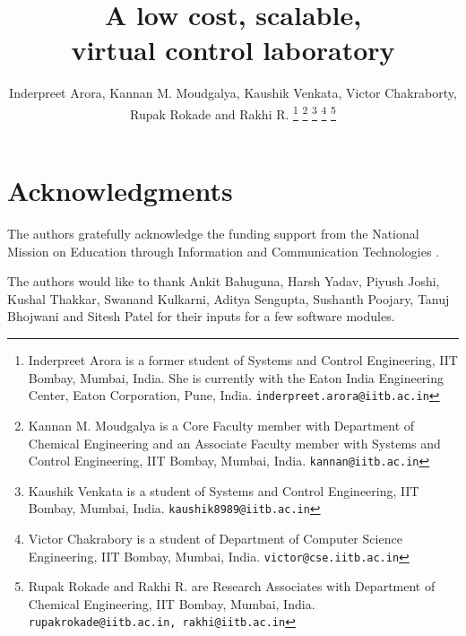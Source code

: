 \documentclass[a4paper, 10pt, conference]{ieeeconf}
\title{\LARGE \bf
A low cost, scalable, \\ virtual control laboratory
}
\author{Inderpreet Arora, Kannan M. Moudgalya, Kaushik Venkata, Victor
  Chakraborty, Rupak Rokade and Rakhi R.%
\thanks{Inderpreet Arora is a former student of Systems and Control
  Engineering, IIT Bombay, Mumbai, India. She is currently with the
  Eaton India Engineering Center, Eaton Corporation, Pune, India. 
        {\tt\small inderpreet.arora@iitb.ac.in}}
\thanks{Kannan M. Moudgalya is a Core Faculty member with Department
  of Chemical Engineering and an Associate Faculty member with Systems
  and Control Engineering, IIT Bombay, Mumbai, India. 
        {\tt\small kannan@iitb.ac.in}}%
\thanks{Kaushik Venkata is a student of Systems and Control
  Engineering, IIT Bombay, Mumbai, India. 
        {\tt\small kaushik8989@iitb.ac.in}}
\thanks{Victor Chakrabory is a student of Department of Computer
  Science Engineering, IIT Bombay, Mumbai, India. 
        {\tt\small victor@cse.iitb.ac.in}}
\thanks{Rupak Rokade and Rakhi R. are Research Associates with
  Department of Chemical Engineering, IIT Bombay, Mumbai, India. 
        {\tt\small rupakrokade@iitb.ac.in, rakhi@iitb.ac.in}}%
}
\begin{document}
\maketitle
\thispagestyle{empty}
\pagestyle{empty}










%






\section*{Acknowledgments}
The authors gratefully acknowledge the funding support from the
National Mission on Education through Information and Communication
Technologies \cite{kmm010}.

The authors would like to thank Ankit Bahuguna, Harsh Yadav, Piyush
Joshi, Kushal Thakkar, Swanand Kulkarni, Aditya Sengupta, Sushanth
Poojary, Tanuj Bhojwani and Sitesh Patel for their inputs for a few
software modules.  
\end{document}
